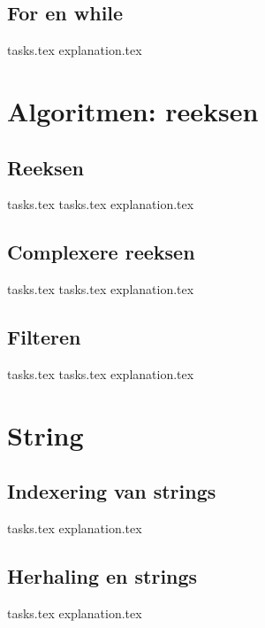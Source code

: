     \section{For en while}
    {tasks.tex}         \newpage
    {explanation.tex}      \newpage

    \chapter{Algoritmen: reeksen}
    \newpage

    \section{Reeksen}
    {tasks.tex}            \newpage
    {tasks.tex}         \newpage
    {explanation.tex}      \newpage

    \section{Complexere reeksen}
    {tasks.tex}        \newpage
    {tasks.tex}     \newpage
    {explanation.tex}  \newpage

    \section{Filteren}
    {tasks.tex}               \newpage
    {tasks.tex}            \newpage
    {explanation.tex}         \newpage

    \chapter{String}
    \newpage

    \section{Indexering van strings}
    {tasks.tex}          \newpage
    {explanation.tex}       \newpage

    \section{Herhaling en strings}
    {tasks.tex}      \newpage
    {explanation.tex}   \newpage

